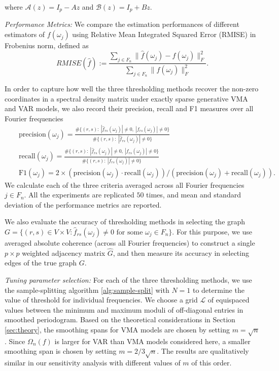 where $\mathcal{A}(z) = I_p - A z$ and $\mathcal{B}(z) = I_p +  B z$.

\smallskip
\textit{Performance Metrics: } We compare the estimation performances of different estimators of  $f(\omega_j)$ using Relative Mean Integrated Squared Error (RMISE) in Frobenius norm, defined as
 \begin{equation*}
{RMISE}(\hat{f}) := \frac{\sum_{j\in F_n} \|\hat{f}(\omega_j) - f(\omega_j)\|_F^2}{\sum_{j\in F_n} \|f(\omega_j)\|_F^2}. 
\end{equation*}

In order to capture how well the three thresholding methods recover the non-zero coordinates in a spectral density matrix under exactly sparse generative VMA and VAR models, we also record their precision, recall and F1 measures over all Fourier frequencies %
\begin{eqnarray}
    && \text{precision}(\omega_j) = %
    \frac{\# \{(r,s): ~ |\hat{f}_{rs}(\omega_j)|\neq 0, ~ |f_{rs}(\omega_j)|\neq 0 \}}{\# \{(r,s): ~ |\hat{f}_{rs}(\omega_j)|\neq 0\}} \nonumber \\
    && \text{recall}(\omega_j) = \frac{\# \{(r,s): ~ |\hat{f}_{rs}(\omega_j)|\neq 0, ~ |f_{rs}(\omega_j)|\neq 0 \}}{\# \{(r,s): ~ |f_{rs}(\omega_j)|\neq 0\}} \nonumber \\
    && \text{F1}(\omega_j) =  2\times (\text{precision}(\omega_j) \cdot \text{recall}(\omega_j))/(\text{precision}(\omega_j) + \text{recall}(\omega_j)). \nonumber 
\end{eqnarray}
We calculate each of the three criteria averaged across all Fourier frequencies $j\in F_n$.  All the experiments are replicated  $50$ times, and mean and standard deviation of the performance metrics are reported. 


We also evaluate the accuracy of thresholding methods in selecting the graph $G = \{ (r,s) \in V \times V: \hat{f}_{rs}(\omega_j) \neq 0 \mbox{ for some } \omega_j \in F_n \}$. For this purpose, we use averaged absolute coherence (across all Fourier frequencies) to construct a single $p \times p$ weighted adjacency matrix $\hat{G}$, and then measure its accuracy in selecting edges of the true graph $G$. \par 

\textit{Tuning parameter selection: } For each of the three thresholding methods, we use the sample-splitting algorithm \ref{alg:sample-split} with $N = 1$ to determine the value of threshold for individual frequencies. We choose a  grid $\mathcal{L}$ of equispaced values between the minimum and maximum moduli of off-diagonal entries in smoothed periodogram.  Based on the theoretical considerations in Section \ref{sec:theory}, the smoothing spans for VMA models are chosen by setting $m = \sqrt{n}$. Since $\Omega_n(f)$ is  larger for VAR than VMA models considered here, a smaller  smoothing span is chosen by setting $m = 2/3\sqrt{n}$. The results are qualitatively similar in our sensitivity analysis with different values of $m$ of this order. 

